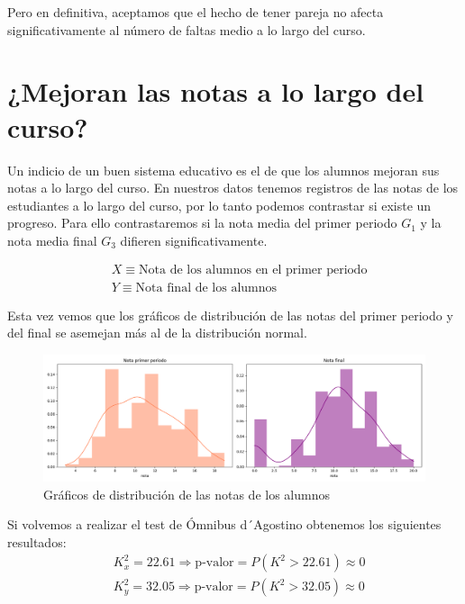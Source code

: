 Pero en definitiva, aceptamos que el hecho de tener pareja no afecta significativamente al número de faltas medio a lo largo del curso.

\pagebreak

\section{¿Mejoran las notas a lo largo del curso?}

Un indicio de un buen sistema educativo es el de que los alumnos mejoran sus notas a lo largo del curso. En nuestros datos tenemos registros de las notas de los estudiantes a lo largo del curso, por lo tanto podemos contrastar si existe un progreso. Para ello contrastaremos si la nota media del primer periodo $G_{1}$ y la nota media final $G_{3}$ difieren significativamente.

\begin{equation}
    \begin{split}
        & X \equiv \text{Nota de los alumnos en el primer periodo}\\
        & Y \equiv \text{Nota final de los alumnos}
    \end{split} 
\end{equation}

Esta vez vemos que los gráficos de distribución de las notas del primer periodo y del final se asemejan más al de la distribución normal.

\begin{figure}[H]
    \centering
    \includegraphics[width=1\textwidth]{./figures/dist-notas-alumnos.png}
    \caption{Gráficos de distribución de las notas de los alumnos}
    \label{fig:dist-notas}
\end{figure}

Si volvemos a realizar el test de Ómnibus d´Agostino obtenemos los siguientes resultados:
\begin{equation*}
    \begin{split}
        & K^2_{x} = 22.61 \Rightarrow \text{p-valor} = P(K^2 > 22.61) \approx 0\\ 
        & K^2_{y} = 32.05 \Rightarrow \text{p-valor} = P(K^2 > 32.05) \approx 0
    \end{split}
\end{equation*}

